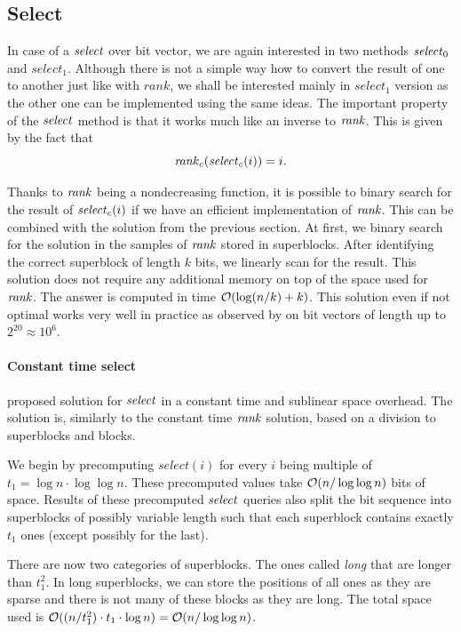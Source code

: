 \subsection{Select}
\label{section:select}

In case of a $\mathit{select}$ over bit vector, we are again interested in two methods $\mathit{select}_0$
and $select_1$. Although there is not a simple way how to convert the result of one to
another just like with $rank$, we shall be interested mainly in $select_1$ version as the
other one can be implemented using the same ideas. The important property of the $\mathit{select}$
method is that it works much like an inverse to $\mathit{rank}$. This is given by the fact that
$$\mathit{rank}_c(\mathit{select}_c(i)) = i.$$

Thanks to $\mathit{rank}$ being a nondecreasing function, it is possible to binary search for the
result of $\mathit{select}_c(i)$ if we have an efficient implementation of $\mathit{rank}$. This can be combined
with the solution from the previous section. At first, we binary search for the solution in the
samples of $\mathit{rank}$ stored in superblocks. After identifying the correct superblock of length $k$
bits, we linearly scan for the result. This solution does not require any additional memory on top
of the space used for $\mathit{rank}$. The answer is computed in time $\mathcal{O}(\log(n/k)+k)$. This solution
even if not optimal works very well in practice as observed by \cite{gonzalez2005practical} on bit
vectors of length up to $2^{20}\approx 10^6$.

\paragraph{Constant time select}

\cite{clark1997compact} proposed solution for $\mathit{select}$ in a constant time and sublinear space
overhead. The solution is, similarly to the constant time $\mathit{rank}$ solution, based on a division
to superblocks and blocks.

We begin by precomputing $select(i)$ for every $i$ being multiple of $t_1=\log n\cdot \log\log n$.
These precomputed values take $\mathcal{O}(n/\log\log n)$ bits of space. Results of these precomputed
$\mathit{select}$ queries also split the bit sequence into superblocks of possibly variable length such that
each superblock contains exactly $t_1$ ones (except possibly for the last).

There are now two categories of superblocks. The ones called \textit{long} that are longer
than $t_1^2$. In long superblocks, we can store the positions of all ones as they are sparse
and there is not many of these blocks as they are long. The total space used is $\mathcal{O}((n/t_1^2)\cdot t_1\cdot
\log n) = \mathcal{O}(n/\log\log n)$.

